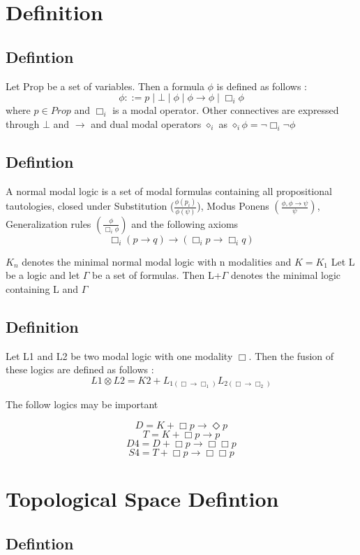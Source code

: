 \documentclass[12pt, a4paper]{scrreprt}
\begin{document}
\chapter{Definition}

\section{Defintion }
Let Prop be a set of variables. Then a formula $\phi$ is defined as follows :
$$\phi ::= p \mid \bot \mid \phi \mid \phi \rightarrow \phi \mid \Box_i \phi$$
where $p \in Prop$ and $\Box_i$ is a modal operator. Other connectives are expressed through $\bot$ and $\rightarrow$ and 
dual modal operators $\diamond_i$ as $\diamond_i \phi = \neg \Box_i \neg \phi$

\section{Defintion }
A normal modal logic is a set of modal formulas containing all propositional tautologies,
closed under Substitution ($\frac{\phi(p_i)}{\phi(\psi)}$), Modus Ponens 
$(\frac{\phi, \phi \rightarrow \psi}{\psi})$, Generalization rules $(\frac{\phi}{\Box_i \phi})$
and the following axioms 
$$ \Box_i (p \rightarrow q) \rightarrow (\Box_i p \rightarrow \Box_i q)$$

$K_n$ denotes the minimal normal modal logic with n modalities and $K = K_1$
Let L be a logic and let $\Gamma$ be a set of formulas. Then L+$\Gamma$ denotes 
the minimal logic containing L and $\Gamma$

\section{Definition}
Let L1 and L2 be two modal logic with one modality $\Box$. Then the fusion of these 
logics are defined as follows :
$$ L1 \otimes L2 = K2 + L_{1(\Box \rightarrow \Box_1)} L_{2(\Box \rightarrow \Box_2)} $$

The follow logics may be important 

$$D = K + \Box p \rightarrow \Diamond p$$
$$T = K + \Box p \rightarrow p$$
$$D4 = D + \Box p \rightarrow \Box \Box p$$
$$S4 = T + \Box p \rightarrow \Box \Box p$$


\chapter{Topological Space Defintion}

\section{Defintion}
\end{document}
